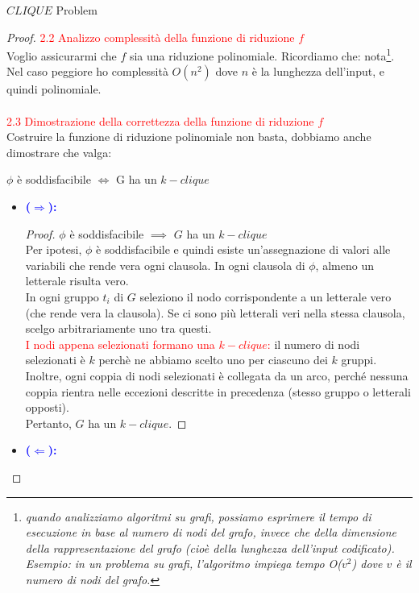 \documentclass{article}  %
\theoremstyle{definition}
\begin{document}
\begin{theorem}{$CLIQUE$ Problem}
\begin{proof}
		\textcolor{red}{2.2 Analizzo complessità della funzione di riduzione $f$} \\
		Voglio assicurarmi che $f$ sia una riduzione polinomiale. Ricordiamo che: nota\footnote{\textit{quando analizziamo algoritmi su grafi, possiamo esprimere il tempo di esecuzione
				in base al numero di nodi del grafo, invece che della dimensione della rappresentazione del grafo (cioè della lunghezza dell'input codificato). Esempio: in un problema su grafi,
				l'algoritmo impiega tempo O($v^2$) dove $v$ è il numero di nodi del grafo.}}. \\
		Nel caso peggiore ho complessità $O(n^2)$ dove $n$ è la lunghezza dell'input, e quindi polinomiale. \\ \\
		\textcolor{red}{2.3 Dimostrazione della correttezza della funzione di riduzione $f$} \\
		Costruire la funzione di riduzione polinomiale non basta, dobbiamo anche dimostrare che valga:
		\begin{center}
			$\phi$ è soddisfacibile $\iff$ G ha un $k-clique$
		\end{center}
		\begin{itemize}
			\item \textcolor{blue}{\textbf{($\Longrightarrow$):}}
			      \begin{proof}
				      $\phi$ è soddisfacibile $\implies$ $G$ ha un $k-clique$ \\
				      Per ipotesi, $\phi$ è soddisfacibile e quindi esiste un'assegnazione di valori
				      alle variabili che rende vera ogni clausola.
				      In ogni clausola di $\phi$, almeno un letterale risulta vero. \\
				      In ogni gruppo $t_i$ di $G$ seleziono il nodo corrispondente a un letterale vero (che rende vera la clausola). Se ci sono più letterali veri nella stessa clausola,
				      scelgo arbitrariamente uno tra questi. \\ \textcolor{red}{I nodi appena selezionati formano una $k-clique$:} il numero di nodi selezionati è $k$ perchè ne abbiamo scelto
				      uno per ciascuno dei $k$ gruppi. Inoltre, ogni coppia di nodi selezionati è collegata da un arco, perché nessuna coppia rientra nelle eccezioni descritte in precedenza
				      (stesso gruppo o letterali opposti). \\
				      Pertanto, $G$ ha un $k-clique$.
			      \end{proof}
			\item \textcolor{blue}{\textbf{($\Longleftarrow$):}}

\end{itemize}
\end{proof}
\end{theorem}
\end{document}
